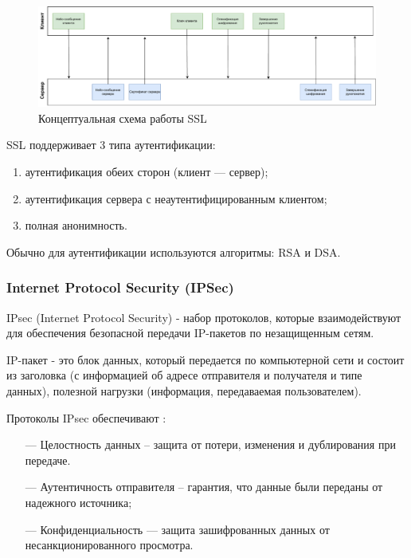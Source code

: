 \begin{figure}[H]
	\centering
	\includegraphics[scale=0.5]{img/ssl.pdf}
	\caption{Концептуальная схема работы SSL}
	\label{fig:ssl}
\end{figure}

SSL поддерживает 3 типа аутентификации:

\begin{enumerate}
	\item аутентификация обеих сторон (клиент — сервер);
	\item аутентификация сервера с неаутентифицированным клиентом;
	\item полная анонимность.
\end{enumerate}

Обычно для аутентификации используются алгоритмы: RSA и DSA. 

\subsubsection{Internet Protocol Security (IPSec)}

IPsec (Internet Protocol Security) - набор протоколов, которые взаимодействуют для обеспечения безопасной передачи IP-пакетов по незащищенным сетям.

IP-пакет - это блок данных, который передается по компьютерной сети и состоит из заголовка (с информацией об адресе отправителя и получателя и типе данных), полезной нагрузки (информация, передаваемая пользователем).

Протоколы IPsec обеспечивают \cite{ipsec}:

\begin{itemize}
	\item [---] Целостность данных -- защита от потери, изменения и дублирования при передаче.
	\item [---] Аутентичность отправителя -- гарантия, что данные были переданы от надежного источника;
	\item [---] Конфиденциальность — защита зашифрованных данных от несанкционированного просмотра.
\end{itemize}

